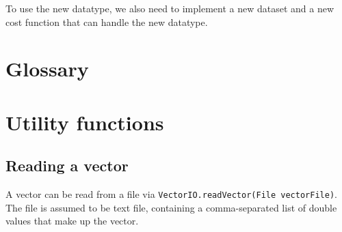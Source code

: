 \documentclass[11pt]{article} %
\newcommand{\code}{\texttt}
\begin{document}
To use the new datatype, we also need to implement a new dataset and a new cost function that can handle the new datatype.

\appendix
\section{Glossary}
\section{Utility functions}
\subsection{Reading a vector} \label{sec:read_vec}
A vector can be read from a file via \code{VectorIO.readVector(File vectorFile)}. The file is assumed to be text file, containing a comma-separated list of double values that make up the vector.
\end{document}
